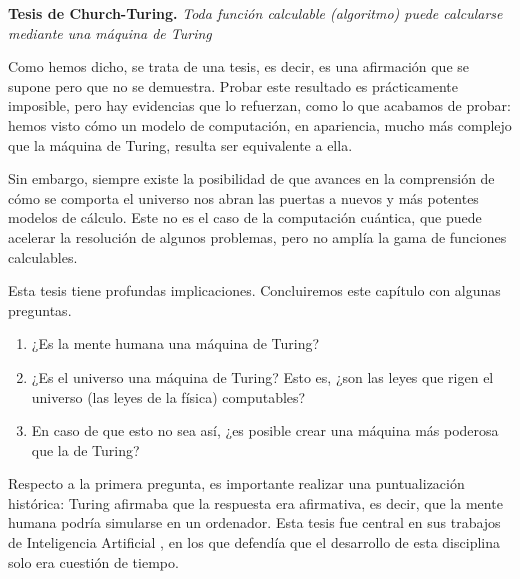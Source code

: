 \begin{adjustwidth}{30pt}{}
    \textbf{Tesis de Church-Turing.} \emph{Toda función calculable (algoritmo) puede calcularse mediante una máquina de Turing}
\end{adjustwidth}

Como hemos dicho, se trata de una tesis, es decir, es una afirmación que se supone pero que no se demuestra. Probar este resultado es prácticamente imposible, pero hay evidencias que lo refuerzan, como lo que acabamos de probar: hemos visto cómo un modelo de computación, en apariencia, mucho más complejo que la máquina de Turing, resulta ser equivalente a ella.

Sin embargo, siempre existe la posibilidad de que avances en la comprensión de cómo se comporta el universo nos abran las puertas a nuevos y más potentes modelos de cálculo. Este no es el caso de la computación cuántica, que puede acelerar la resolución de algunos problemas, pero no amplía la gama de funciones calculables. \cite{Kaye2007}

Esta tesis tiene profundas implicaciones. Concluiremos este capítulo con algunas preguntas.

\begin{enumerate}
    \item ¿Es la mente humana una máquina de Turing?
    \item ¿Es el universo una máquina de Turing? Esto es, ¿son las leyes que rigen el universo (las leyes de la física) computables?
    \item En caso de que esto no sea así, ¿es posible crear una máquina más poderosa que la de Turing?
\end{enumerate}

Respecto a la primera pregunta, es importante realizar una puntualización histórica: Turing afirmaba que la respuesta era afirmativa, es decir, que la mente humana podría simularse en un ordenador. Esta tesis fue central en sus trabajos de Inteligencia Artificial \cite{Turing1950}, en los que defendía que el desarrollo de esta disciplina solo era cuestión de tiempo.

\endinput
